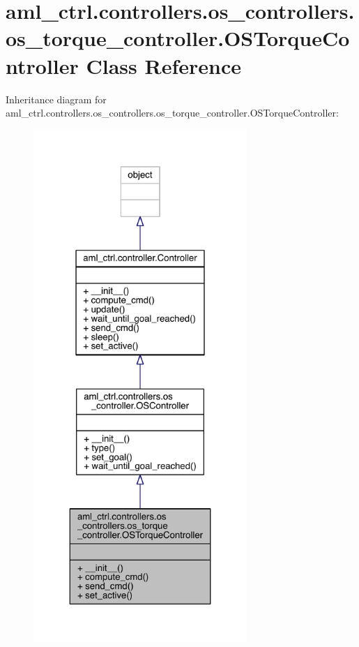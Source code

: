 \hypertarget{classaml__ctrl_1_1controllers_1_1os__controllers_1_1os__torque__controller_1_1_o_s_torque_controller}{}\section{aml\+\_\+ctrl.\+controllers.\+os\+\_\+controllers.\+os\+\_\+torque\+\_\+controller.\+O\+S\+Torque\+Controller Class Reference}
\label{classaml__ctrl_1_1controllers_1_1os__controllers_1_1os__torque__controller_1_1_o_s_torque_controller}


Inheritance diagram for aml\+\_\+ctrl.\+controllers.\+os\+\_\+controllers.\+os\+\_\+torque\+\_\+controller.\+O\+S\+Torque\+Controller\+:\nopagebreak
\begin{figure}[H]
\begin{center}
\leavevmode
\includegraphics[height=550pt]{classaml__ctrl_1_1controllers_1_1os__controllers_1_1os__torque__controller_1_1_o_s_torque_controller__inherit__graph}
\end{center}
\end{figure}


